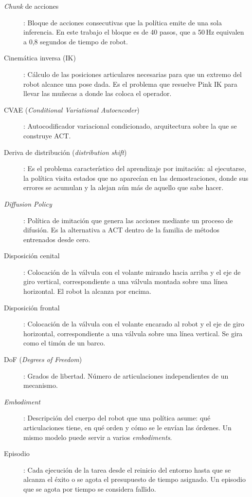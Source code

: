 \begin{description}
	\item[\textit{Chunk} de acciones]: Bloque de acciones consecutivas que la política emite de una
	sola inferencia. En este trabajo el bloque es de 40 pasos, que a 50\,Hz equivalen a 0,8
	segundos de tiempo de robot.

	\item[Cinemática inversa (IK)]: Cálculo de las posiciones articulares necesarias para que un
	extremo del robot alcance una pose dada. Es el problema que resuelve Pink IK para llevar las
	muñecas a donde las coloca el operador.

	\item[CVAE (\textit{Conditional Variational Autoencoder})]: Autocodificador variacional
	condicionado, arquitectura sobre la que se construye ACT.

	\item[Deriva de distribución (\textit{distribution shift})]: Es el problema característico del
	aprendizaje por imitación: al ejecutarse, la política visita estados que no aparecían en las
	demostraciones, donde sus errores se acumulan y la alejan aún más de aquello que sabe hacer.

	\item[\textit{Diffusion Policy}]: Política de imitación que genera las acciones mediante un
	proceso de difusión. Es la alternativa a ACT dentro de la familia de métodos entrenados desde
	cero.
	
	\item[Disposición cenital]: Colocación de la válvula con el volante mirando hacia arriba y el
	eje de giro vertical, correspondiente a una válvula montada sobre una línea horizontal. El
	robot la alcanza por encima.

	\item[Disposición frontal]: Colocación de la válvula con el volante encarado al robot y el eje
	de giro horizontal, correspondiente a una válvula sobre una línea vertical. Se gira como el
	timón de un barco.

	\item[DoF (\textit{Degrees of Freedom})]: Grados de libertad. Número de articulaciones
	independientes de un mecanismo.

	\item[\textit{Embodiment}]: Descripción del cuerpo del robot que una política asume: qué
	articulaciones tiene, en qué orden y cómo se le envían las órdenes. Un mismo modelo puede
	servir a varios \textit{embodiments}.

	\item[Episodio]: Cada ejecución de la tarea desde el reinicio del entorno hasta que se alcanza
	el éxito o se agota el presupuesto de tiempo asignado. Un episodio que se agota por tiempo se
	considera fallido.


\end{description}
